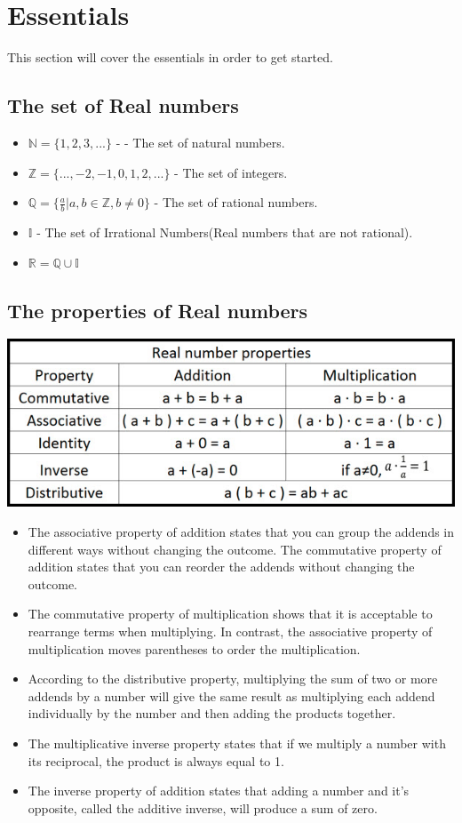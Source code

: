 \section{Essentials}
This section will cover the essentials in order to get started. 
\subsection{The set of Real numbers}
\begin{itemize}
    \item $\mathbb{N} = \{1, 2, 3, ...\}$ - - The set of natural numbers. 
    \item $\mathbb{Z} = \{..., -2, -1, 0, 1, 2, ...\}$ - The set of integers.
    \item $\mathbb{Q} = \{\frac{a}{b} | a, b \in \mathbb{Z}, b \neq 0\}$ - The set of rational numbers. 
    \item $\mathbb{I}$ - The set of Irrational Numbers(Real numbers that are not rational). 
    \item $\mathbb{R} = \mathbb{Q} \cup \mathbb{I}$
\end{itemize}


\subsection{The properties of Real numbers}
\includegraphics{algebra-pre-calculus/essentials/sets2.jpg}
\begin{itemize}
    \item The associative property of addition states that you can group the addends in different ways without changing the outcome. The commutative property of addition states that you can reorder the addends without changing the outcome.
    \item The commutative property of multiplication shows that it is acceptable to rearrange terms when multiplying. In contrast, the associative property of multiplication moves parentheses to order the multiplication.
    \item According to the distributive property, multiplying the sum of two or more addends by a number will give the same result as multiplying each addend individually by the number and then adding the products together.
    \item The multiplicative inverse property states that if we multiply a number with its reciprocal, the product is always equal to 1.
    \item The inverse property of addition states that adding a number and it's opposite, called the additive inverse, will produce a sum of zero.
\end{itemize}
